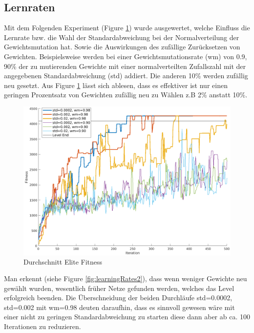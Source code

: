 \documentclass{hbrs-ecta-report}
\begin{document}
\subsection{Lernraten}
Mit dem Folgenden Experiment (Figure \ref{fig:learningRates}) wurde ausgewertet, welche Einfluss die Lernrate bzw. die Wahl der Standardabweichung bei der Normalverteilung der Gewichtsmutation hat. Sowie die Auswirkungen des zufällige Zurücksetzen von Gewichten.
Beispielsweise werden bei einer Gewichtsmutationsrate (wm) von 0.9, 90\% der zu mutierenden Gewichte mit einer normalverteilten Zufallszahl mit der angegebenen Standardabweichung (std) addiert. Die anderen 10\% werden zufällig neu gesetzt. \newline
Aus Figure \ref{fig:learningRates} lässt sich ablesen, dass es effektiver ist nur einen geringen Prozentsatz von Gewichten zufällig neu zu Wählen z.B 2\% anstatt 10\%.



\begin{figure}[ht!]
	\centering
	\includegraphics[width=\linewidth]{img/learningRates.png}
	\caption{Durchschnitt Elite Fitness}
	\label{fig:learningRates} 
\end{figure}

Man erkennt (siehe Figure \ref{fig:learningRates2}), dass wenn weniger Gewichte neu gewählt wurden, wesentlich früher Netze gefunden werden, welches das Level erfolgreich beenden.
Die Überschneidung der beiden Durchläufe std=0.0002, std=0.002 mit wm=0.98 deuten daraufhin, dass es sinnvoll gewesen wäre mit einer nicht zu geringen Standardabweichung zu starten diese dann aber ab ca. 100 Iterationen zu reduzieren.
\end{document}
